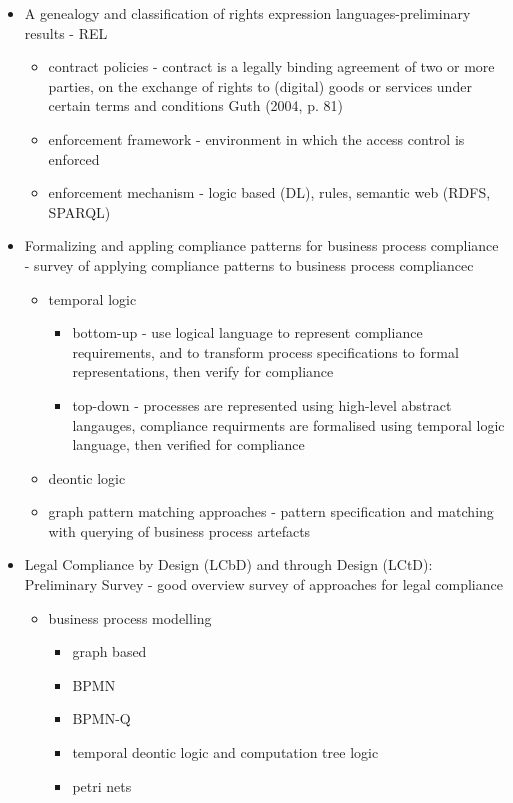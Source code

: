 \begin{itemize}
\begin{itemize}
	\end{itemize}
\item A genealogy and classification of rights expression languages-preliminary results - REL
	\begin{itemize}
	\item contract policies -  contract is a legally binding agreement of two or more parties, on the exchange of rights to (digital) goods or services under certain terms and conditions Guth (2004, p. 81)
	\item enforcement framework - environment in which the access control is enforced
	\item enforcement mechanism - logic based (DL), rules, semantic web (RDFS, SPARQL)
	\end{itemize}
\item Formalizing and appling compliance patterns for business process compliance - survey of applying compliance patterns to business process compliancec
	\begin{itemize}
	\item temporal logic
		\begin{itemize}
		\item bottom-up - use logical language to represent compliance requirements, and to transform process specifications to formal representations, then verify for compliance
		\item top-down - processes are represented using high-level abstract langauges, compliance requirments are formalised using temporal logic language, then verified for compliance
		\end{itemize}
	\item deontic logic 
	\item graph pattern matching approaches - pattern specification and matching with querying of business process artefacts
	\end{itemize}
\item Legal Compliance by Design (LCbD) and through Design (LCtD): Preliminary Survey - good overview survey of approaches for legal compliance
	\begin{itemize}
	\item business process modelling
		\begin{itemize}
		\item graph based 
		\item BPMN
		\item BPMN-Q
		\item temporal deontic logic and computation tree logic
		\item petri nets

\end{itemize}
\end{itemize}
\end{itemize}
